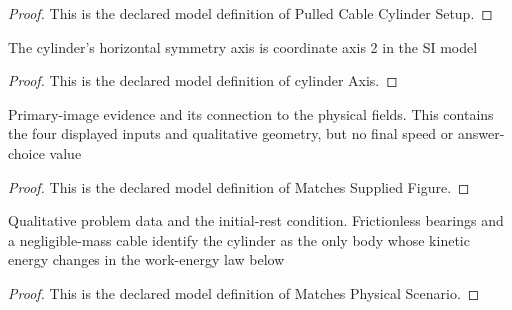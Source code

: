 \begin{proof}
  This is the declared model definition of Pulled Cable Cylinder Setup.
\end{proof}
\begin{definition}
  \label{def:physics:phyx-mini-0820:phyxminiproblems-problemphyxmini0820-cylinderaxis}
  The cylinder's horizontal symmetry axis is coordinate axis 2 in the SI model
\end{definition}
\begin{proof}
  This is the declared model definition of cylinder Axis.
\end{proof}
\begin{definition}
  \label{def:physics:phyx-mini-0820:phyxminiproblems-problemphyxmini0820-matchessuppliedfigure}
  Primary-image evidence and its connection to the physical fields. This contains the four displayed inputs and qualitative geometry, but no final speed or answer-choice value
\end{definition}
\begin{proof}
  This is the declared model definition of Matches Supplied Figure.
\end{proof}
\begin{definition}
  \label{def:physics:phyx-mini-0820:phyxminiproblems-problemphyxmini0820-matchesphysicalscenario}
  Qualitative problem data and the initial-rest condition. Frictionless bearings and a negligible-mass cable identify the cylinder as the only body whose kinetic energy changes in the work-energy law below
\end{definition}
\begin{proof}
  This is the declared model definition of Matches Physical Scenario.
\end{proof}
